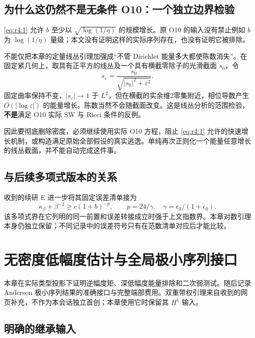 \documentclass[UTF8,11pt,openany,oneside,fontset=none]{ctexbook}
\begin{document}
\section{为什么这仍然不是无条件 O10：一个独立边界检验}\label{ch4:ux4e3aux4ec0ux4e48ux8fd9ux4ecdux7136ux4e0dux662fux65e0ux6761ux4ef6-o10ux4e00ux4e2aux72ecux7acbux8fb9ux754cux68c0ux9a8c}

\eqref{eq:r4:1} 允许 \(b\) 至少以 \(\sqrt{\log(1/\eta)}\) 的规模增长。原 O10 的输入没有禁止例如 \(b\) 为 \(\log(1/\eta)\) 量级；本文没有证明这样的实际序列存在，也没有证明它被排除。

不能仅把本章的定量线丛引理加强成``不管 Dirichlet 能量多大都使陈数消失''。在固定紧几何上，取具有正平方的线丛及一个具有横截零除子的光滑截面 \(s_0\)，令 \[
s_\varepsilon=\frac{s_0}{\sqrt{|s_0|^2+\varepsilon^2}}.
\] 固定曲率保持不变，\(|s_\varepsilon|\to1\) 于 \(L^2\)，但在横截的实余维2零集附近，相位导数产生 \(O(|\log\varepsilon|)\) 的能量增长。陈数当然不会随截面改变。这是线丛分析的范围检验，\textbf{不是}满足 O10 实际 SW 与 Ricci 条件的反例。

因此要彻底删除密度，必须继续使用实际 O10 方程，阻止 \eqref{eq:r4:1} 允许的快速增长机制，或构造满足原始全部假设的真实逃逸。单纯再次正则化一个能量任意增长的线丛截面，并不能自动完成这件事。

\section{与后续多项式版本的关系}\label{ch4:ux4e0eux540eux7eedux591aux9879ux5f0fux7248ux672cux7684ux5173ux7cfb}

收到的续研 E 进一步将其固定误差清单接为 \[
\kappa_\beta+\beta^{-2}\ge c(1+b)^{-p},
\qquad p=24/\gamma,\quad\gamma=\epsilon_0/(1+\epsilon_0).
\] 该多项式界在它列明的同一前置和误差转接成立时强于上文指数界。本章对数引理本身仍独立保留；不同记录中的误差符号只有在范数清单对应后才能比较。\cite{WeightedReport}


\chapter{无密度低幅度估计与全局极小序列接口}\label{chapter:5}
本章在实际类型投影下证明逆幅度矩、深低幅度能量排除和二次弱测试。随后记录 Anderson 极小序列结果的准确接口与完整端部费用。双重带权引理来自收到的网页补充，不作为本会话独立首创；本章使用它时保留其 \(H^1\) 输入。\cite{R05,Weighted,Anderson}

\section{明确的继承输入}\label{ch5:ux660eux786eux7684ux7ee7ux627fux8f93ux5165}
\end{document}
